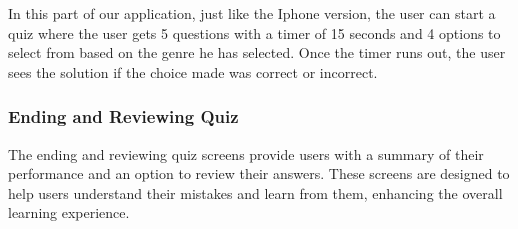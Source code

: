 In this part of our application, just like the Iphone version, the user can start a quiz where the user gets 5 questions with a timer of 15 seconds and 4 options to select from based on the genre he has selected. Once the timer runs out, the user sees the solution if the choice made was correct or incorrect.

\subsubsection{Ending and Reviewing Quiz}

The ending and reviewing quiz screens provide users with a summary of their performance and an option to review their answers. These screens are designed to help users understand their mistakes and learn from them, enhancing the overall learning experience.

